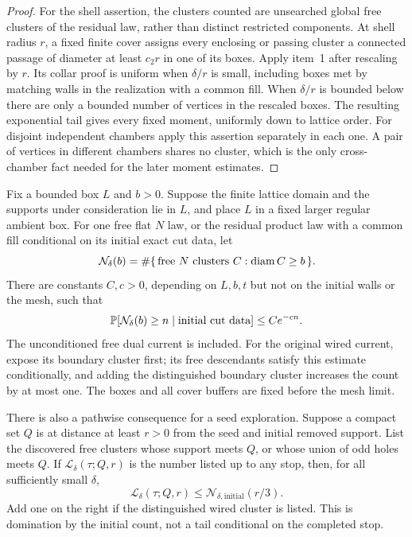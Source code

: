 \begin{proof}
For the shell assertion, the clusters counted are unsearched global
free clusters of the residual law, rather than distinct restricted
components. At shell
radius $r$, a fixed finite cover assigns every enclosing or passing
cluster a connected passage of diameter at least $c_2r$ in one
of its boxes. Apply item~1 after rescaling by $r$. Its collar proof
is uniform when $\delta/r$ is small, including boxes met by matching
walls in the realization with a common fill. When $\delta/r$ is bounded
below there are only a bounded number of vertices in the rescaled
boxes. The resulting exponential tail gives every fixed moment,
uniformly down to lattice order. For disjoint independent chambers
apply this assertion separately in each one. A pair of vertices in
different chambers shares no cluster, which is the only
cross-chamber fact needed for the later moment estimates.
\end{proof}

\begin{corollary}
\label{cor:global-cluster-counts}
Fix a bounded box $L$ and $b>0$. Suppose the finite lattice domain
and the supports under consideration lie in $L$, and place $L$ in
a fixed larger regular ambient box. For one free flat $N$ law, or
the residual product law with a common fill conditional on its initial
exact cut data, let
\[
 \mathcal N_\delta(b)
   =\#\{\,\text{free }N\text{ clusters }C:\diam C\ge b\,\}.
\]
There are constants $C,c>0$, depending on $L,b,t$ but not on the
initial walls or the mesh, such that
\begin{equation}\label{eq:spatial-global-count-tail}
       \P[\mathcal N_\delta(b)\ge n\mid\text{initial cut data}]
                       \le C e^{-cn}.
\end{equation}
The unconditioned free dual current is included. For the original
wired current, expose its boundary cluster first; its free
descendants satisfy this estimate conditionally, and adding the
distinguished boundary cluster increases the count by at most one.
The boxes and all cover buffers are fixed before the mesh limit.

There is also a pathwise consequence for a seed exploration. Suppose
a compact set $Q$ is at distance at least $r>0$ from the seed and
initial removed support. List the discovered free clusters whose
support meets $Q$, or whose union of odd holes meets $Q$. If
$\mathcal L_\delta(\tau;Q,r)$ is the number listed up to any stop,
then, for all sufficiently small $\delta$,
\begin{equation}\label{eq:spatial-contributor-domination}
       \mathcal L_\delta(\tau;Q,r)
                       \le \mathcal N_{\delta,\mathrm{initial}}(r/3).
\end{equation}
Add one on the right if the distinguished wired cluster is listed.
This is domination by the initial count, not a tail conditional on
the completed stop.
\end{corollary}

